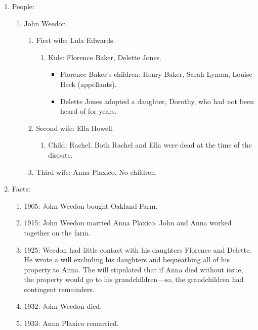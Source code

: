\begin{enumerate}
    \item People:
    \begin{enumerate}
        \item John Weedon.
        \begin{enumerate}
            \item First wife: Lula Edwards.
            \begin{enumerate}
                \item Kids: Florence Baker, Delette Jones.
                \begin{itemize}
                    \item Florence Baker's children: Henry Baker, Sarah Lyman, 
                    Louise Heck (appellants).
                    \item Delette Jones adopted a daughter, Dorothy, who had 
                    not been heard of for years.
                \end{itemize}
            \end{enumerate}
            \item Second wife: Ella Howell.
            \begin{enumerate}
                \item Child: Rachel. Both Rachel and Ella were dead at the 
                time of the dispute.
            \end{enumerate}
            \item Third wife: Anna Plaxico. No children.
        \end{enumerate}
    \end{enumerate}
    \item Facts:
    \begin{enumerate}
        \item 1905: John Weedon bought Oakland Farm.
        \item 1915: John Weedon married Anna Plaxico. John and Anna worked 
        together on the farm.
        \item 1925: Weedon had little contact with his daughters Florence and 
        Delette. He wrote a will excluding his daughters and bequeathing all 
        of his property to Anna. The will stipulated that if Anna died without 
        issue, the property would go to his grandchildren---so, the 
        grandchildren had contingent remainders.
        \item 1932: John Weedon died.
        \item 1933: Anna Plaxico remarried.

\end{enumerate}
\end{enumerate}

